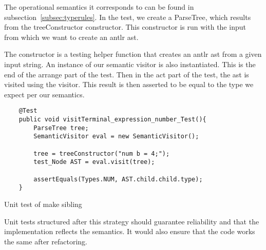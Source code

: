 The operational semantics it corresponds to can be found in subsection~\ref{subsec:typerules}. In the test, we create a ParseTree, which results from the treeConstructor constructor. This constructor is run with the input from which we want to create an \gls{antlr} \gls{ast}.

The constructor is a testing helper function that creates an \gls{antlr} \gls{ast} from a given input string. An instance of our semantic visitor is also instantiated. This is the end of the arrange part of the test. Then in the act part of the test, the \gls{ast} is visited using the visitor. This result is then asserted to be equal to the type we expect per our semantics.

\begin{listing}[htb!]
    \begin{verbatim}
    @Test
    public void visitTerminal_expression_number_Test(){
        ParseTree tree;
        SemanticVisitor eval = new SemanticVisitor();
        
        tree = treeConstructor("num b = 4;");
        test_Node AST = eval.visit(tree);

        assertEquals(Types.NUM, AST.child.child.type);
    }
    \end{verbatim}
    \caption{Unit test of make sibling}
    \label{lst:Unit test of visitTerminalexpression}
\end{listing}

Unit tests structured after this strategy should guarantee reliability and that the implementation reflects the semantics. It would also ensure that the code works the same after refactoring.